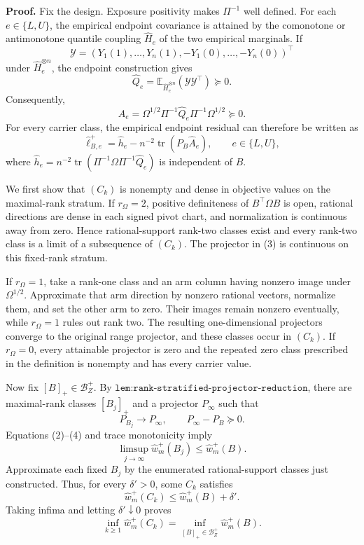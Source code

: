 \textbf{Proof.}
Fix the design.  Exposure positivity makes \(\Pi^{-1}\) well defined.  For each \(e\in\{L,U\}\), the empirical endpoint covariance is attained by the comonotone or antimonotone quantile coupling \(\widehat H_e\) of the two empirical marginals.  If
\[
\mathcal Y=(Y_1(1),\ldots,Y_n(1),-Y_1(0),\ldots,-Y_n(0))^{\top}
\]
under \(\widehat H_e^{\otimes n}\), the endpoint construction gives
\[
\widehat Q_e=\mathbb E_{\widehat H_e^{\otimes n}}(\mathcal Y\mathcal Y^{\top})\succeq0.
\tag{1}
\]
Consequently,
\[
\widehat A_e
=\Omega^{1/2}\Pi^{-1}\widehat Q_e\Pi^{-1}\Omega^{1/2}
\succeq0.
\tag{2}
\]
For every carrier class, the empirical endpoint residual can therefore be written as
\[
\widehat\ell_{B,e}^+
=\widehat h_e-n^{-2}\operatorname{tr}(P_B\widehat A_e),
\qquad e\in\{L,U\},
\tag{3}
\]
where \(\widehat h_e=n^{-2}\operatorname{tr}(\Pi^{-1}\Omega\Pi^{-1}\widehat Q_e)\) is independent of \(B\).

We first show that \((C_k)\) is nonempty and dense in objective values on the maximal-rank stratum.  If \(r_\Omega=2\), positive definiteness of \(B^{\top}\Omega B\) is open, rational directions are dense in each signed pivot chart, and normalization is continuous away from zero.  Hence rational-support rank-two classes exist and every rank-two class is a limit of a subsequence of \((C_k)\).  The projector in (3) is continuous on this fixed-rank stratum.

If \(r_\Omega=1\), take a rank-one class and an arm column having nonzero image under \(\Omega^{1/2}\).  Approximate that arm direction by nonzero rational vectors, normalize them, and set the other arm to zero.  Their images remain nonzero eventually, while \(r_\Omega=1\) rules out rank two.  The resulting one-dimensional projectors converge to the original range projector, and these classes occur in \((C_k)\).  If \(r_\Omega=0\), every attainable projector is zero and the repeated zero class prescribed in the definition is nonempty and has every carrier value.

Now fix \([B]_+\in\mathcal B_Z^+\).  By \(\texttt{lem:rank-stratified-projector-reduction}\), there are maximal-rank classes \([B_j]_+\) and a projector \(P_\infty\) such that
\[
P_{B_j}\longrightarrow P_\infty,
\qquad P_\infty-P_B\succeq0.
\tag{4}
\]
Equations (2)--(4) and trace monotonicity imply
\[
\limsup_{j\to\infty}\widehat w_m^+(B_j)
\le \widehat w_m^+(B).
\tag{5}
\]
Approximate each fixed \(B_j\) by the enumerated rational-support classes just constructed.  Thus, for every \(\delta'>0\), some \(C_k\) satisfies
\[
\widehat w_m^+(C_k)\le\widehat w_m^+(B)+\delta'.
\tag{6}
\]
Taking infima and letting \(\delta'\downarrow0\) proves
\[
\inf_{k\ge1}\widehat w_m^+(C_k)
=\inf_{[B]_+\in\mathcal B_Z^+}\widehat w_m^+(B).
\tag{7}
\]

